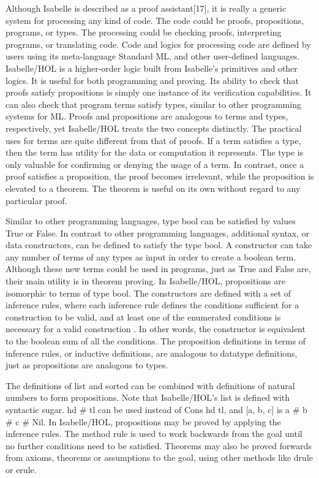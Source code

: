 Although Isabelle is described as a proof assistant[17], it is really a generic system for
processing any kind of code.  The code could be proofs, propositions, programs, or types.  The
processing could be checking proofs, interpreting programs, or translating code.  Code and
logics for processing code are defined by users using its meta-language Standard ML, and other
user-defined languages.  Isabelle/HOL is a higher-order logic built from Isabelle's primitives
and other logics.  It is useful for both programming and proving.  Its ability to check that
proofs satisfy propositions is simply one instance of its verification capabilities.  It can
also check that program terms satisfy types, similar to other programming systems for ML.
Proofs and propositions are analogous to terms and types, respectively, yet Isabelle/HOL treats
the two concepts distinctly.  The practical uses for terms are quite different from that of
proofs.  If a term satisfies a type, then the term has utility for the data or computation it
represents.  The type is only valuable for confirming or denying the usage of a term.  In
contrast, once a proof satisfies a proposition, the proof becomes irrelevant, while the
proposition is elevated to a theorem.  The theorem is useful on its own without regard to any
particular proof.

Similar to other programming languages, type bool can be satisfied by values True or False. In
contrast to other programming languages, additional syntax, or data constructors, can be
defined to satisfy the type bool.  A constructor can take any number of terms of any types as
input in order to create a boolean term. Although these new terms could be used in programs,
just as True and False are, their main utility is in theorem proving.  In Isabelle/HOL,
propositions are isomorphic to terms of type bool.  The constructors are defined with a set of
inference rules, where each inference rule defines the conditions sufficient for a
construction to be valid, and at least one of the enumerated conditions is necessary for a
valid construction .  In other words, the constructor is equivalent to the boolean sum of all
the conditions.  The proposition definitions in terms of inference rules, or inductive
definitions, are analogous to datatype definitions, just as propositions are analogous to
types.


The definitions of list and sorted can be combined with definitions of natural numbers to form
propositions.  Note that Isabelle/HOL's list is defined with syntactic sugar. hd \# tl can be
used instead of Cons hd tl, and [a, b, c] is a \# b \# c \# Nil.  In Isabelle/HOL, propositions
may be proved by applying the inference rules.  The method rule is used to work backwards from
the goal until no further conditions need to be satisfied.  Theorems may also be proved
forwards from axioms, theorems or assumptions to the goal, using other methods like drule or
erule.


